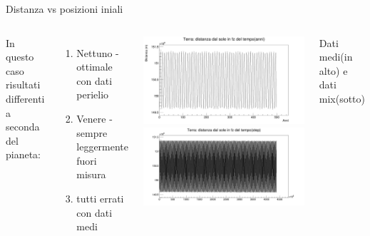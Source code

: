         \begin{frame}{Distanza vs posizioni iniali}
            \begin{columns}
                    In questo caso risultati differenti a seconda del pianeta:
                    \begin{enumerate}
                        \item Nettuno - ottimale con dati perielio
                        \item Venere - sempre leggermente fuori misura
                        \item tutti errati con dati medi
                    \end{enumerate}
                    \centering
                    \includegraphics[width=\textwidth]{5_distanza/terra_medi.jpg}
                    \includegraphics[width=\textwidth]{5_distanza/mototera_500.jpg}
                    \label{cfr::Terra} 
                    \caption{Dati medi(in alto) e dati mix(sotto)}
            \end{columns}
        \end{frame}
